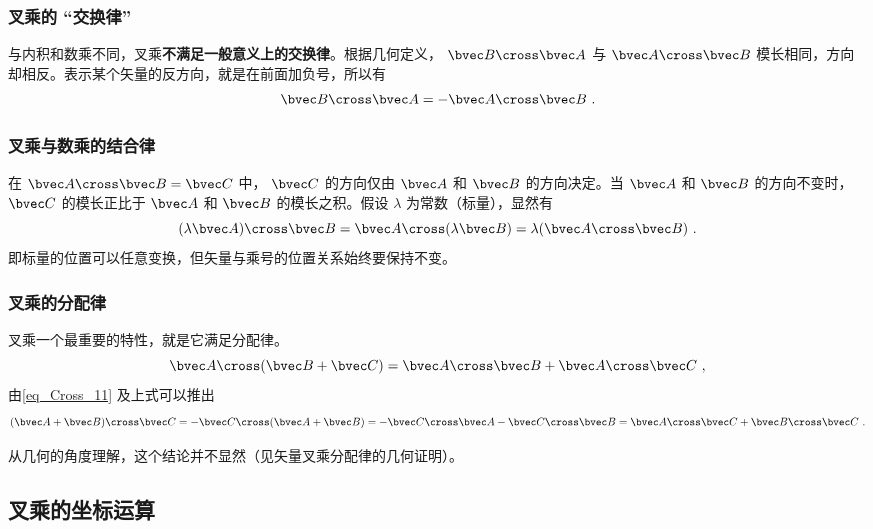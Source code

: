 \subsubsection{叉乘的 “交换律”}
与内积和数乘不同，叉乘\textbf{不满足一般意义上的交换律}。根据几何定义， $\bvec B \cross \bvec A$ 与 $\bvec A \cross \bvec B$ 模长相同，方向却相反。表示某个矢量的反方向，就是在前面加负号，所以有
\begin{equation}\label{eq_Cross_11}
\bvec B \cross \bvec A = -\bvec A \cross \bvec B~.
\end{equation}

\subsubsection{叉乘与数乘的结合律}

在 $\bvec A \cross \bvec B = \bvec C$ 中， $\bvec C$ 的方向仅由 $\bvec A$ 和 $\bvec B$ 的方向决定。当 $\bvec A$ 和 $\bvec B$ 的方向不变时， $\bvec C$ 的模长正比于 $\bvec A$ 和 $\bvec B$ 的模长之积。假设 $\lambda $ 为常数（标量），显然有
\begin{equation}
(\lambda \bvec A) \cross \bvec B = \bvec A \cross (\lambda \bvec B) = \lambda (\bvec A \cross \bvec B)~.
\end{equation}
即标量的位置可以任意变换，但矢量与乘号的位置关系始终要保持不变。

\subsubsection{叉乘的分配律}

叉乘一个最重要的特性，就是它满足分配律。
\begin{equation}\label{eq_Cross_6}
\bvec A \cross (\bvec B +\bvec C) = \bvec A \cross \bvec B + \bvec A \cross \bvec C~,
\end{equation}
由\autoref{eq_Cross_11} 及上式可以推出
\begin{equation}\label{eq_Cross_7}
(\bvec A + \bvec B) \cross \bvec C =  - \bvec C \cross (\bvec A + \bvec B) =  - \bvec C \cross \bvec A - \bvec C \cross \bvec B = \bvec A \cross \bvec C + \bvec B \cross \bvec C~.
\end{equation}

从几何的角度理解，这个结论并不显然（见矢量叉乘分配律的几何证明）。

\subsection{叉乘的坐标运算}
